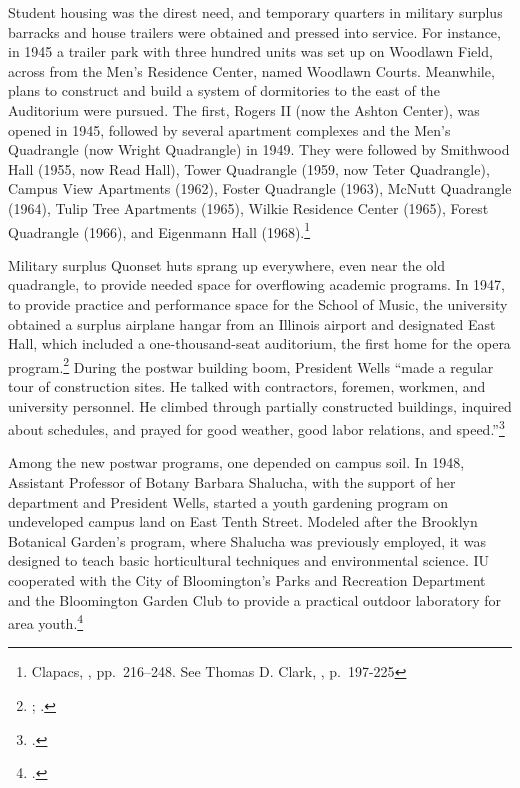 \documentclass[
  american,
  letterpaper,
]{scrreprt}
\begin{document}
Student housing was the direst need, and temporary quarters in military
surplus barracks and house trailers were obtained and pressed into
service. For instance, in 1945 a trailer park with three hundred units
was set up on Woodlawn Field, across from the Men's Residence Center,
named Woodlawn Courts. Meanwhile, plans to construct and build a system
of dormitories to the east of the Auditorium were pursued. The first,
Rogers II (now the Ashton Center), was opened in 1945, followed by
several apartment complexes and the Men's Quadrangle (now Wright
Quadrangle) in 1949. They were followed by Smithwood Hall (1955, now
Read Hall), Tower Quadrangle (1959, now Teter Quadrangle), Campus View
Apartments (1962), Foster Quadrangle (1963), McNutt Quadrangle (1964),
Tulip Tree Apartments (1965), Wilkie Residence Center (1965), Forest
Quadrangle (1966), and Eigenmann Hall (1968).\footnote{Clapacs,
  ,
  pp.~216--248. See Thomas D. Clark,
  , p.~197-225}

Military surplus Quonset huts sprang up everywhere, even near the old
quadrangle, to provide needed space for overflowing academic programs.
In 1947, to provide practice and performance space for the School of
Music, the university obtained a surplus airplane hangar from an
Illinois airport and designated East Hall, which included a
one-thousand-seat auditorium, the first home for the opera
program.\footnote{; .} During the postwar
building boom, President Wells ``made a regular tour of construction
sites. He talked with contractors, foremen, workmen, and university
personnel. He climbed through partially constructed buildings, inquired
about schedules, and prayed for good weather, good labor relations, and
speed.''\footnote{.}

Among the new postwar programs, one depended on campus soil. In 1948,
Assistant Professor of Botany Barbara Shalucha, with the support of her
department and President Wells, started a youth gardening program on
undeveloped campus land on East Tenth Street. Modeled after the Brooklyn
Botanical Garden's program, where Shalucha was previously employed, it
was designed to teach basic horticultural techniques and environmental
science. IU cooperated with the City of Bloomington's Parks and
Recreation Department and the Bloomington Garden Club to provide a
practical outdoor laboratory for area youth.\footnote{.}
\end{document}
